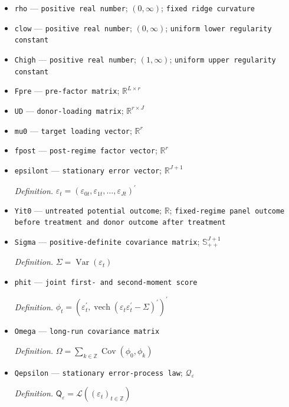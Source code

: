 \documentclass{article}
\begin{document}
\begin{itemize}
  \item \texttt{rho} --- \texttt{positive real number}; \((0,\infty)\); \texttt{fixed ridge curvature}
  \item \texttt{clow} --- \texttt{positive real number}; \((0,\infty)\); \texttt{uniform lower regularity constant}
  \item \texttt{Chigh} --- \texttt{positive real number}; \((1,\infty)\); \texttt{uniform upper regularity constant}
  \item \texttt{Fpre} --- \texttt{pre-\allowbreak{}factor matrix}; \(\mathbb R^{L\times r}\)
  \item \texttt{UD} --- \texttt{donor-\allowbreak{}loading matrix}; \(\mathbb R^{r\times J}\)
  \item \texttt{mu0} --- \texttt{target loading vector}; \(\mathbb R^r\)
  \item \texttt{fpost} --- \texttt{post-\allowbreak{}regime factor vector}; \(\mathbb R^r\)
  \item \texttt{epsilont} --- \texttt{stationary error vector}; \(\mathbb R^{J+1}\)
  \par\smallskip\noindent\emph{Definition.} \(\varepsilon_t=(\varepsilon_{0t},\varepsilon_{1t},\ldots,\varepsilon_{Jt})^{\prime}\)
  \item \texttt{Yit0} --- \texttt{untreated potential outcome}; \(\mathbb R\); \texttt{fixed-\allowbreak{}regime panel outcome before treatment and donor outcome after treatment}
  \item \texttt{Sigma} --- \texttt{positive-\allowbreak{}definite covariance matrix}; \(\mathbb S_{++}^{J+1}\)
  \par\smallskip\noindent\emph{Definition.} \(\Sigma=\operatorname{Var}(\varepsilon_t)\)
  \item \texttt{phit} --- \texttt{joint first-\allowbreak{} and second-\allowbreak{}moment score}
  \par\smallskip\noindent\emph{Definition.} \(\phi_t=(\varepsilon_t^{\prime},\operatorname{vech}(\varepsilon_t\varepsilon_t^{\prime}-\Sigma)^{\prime})^{\prime}\)
  \item \texttt{Omega} --- \texttt{long-\allowbreak{}run covariance matrix}
  \par\smallskip\noindent\emph{Definition.} \(\Omega=\sum_{k\in\mathbb Z}\operatorname{Cov}(\phi_0,\phi_k)\)
  \item \texttt{Qepsilon} --- \texttt{stationary error-\allowbreak{}process law}; \(\mathcal Q_{\varepsilon}\)
  \par\smallskip\noindent\emph{Definition.} \(\mathsf Q_{\varepsilon}=\mathcal L((\varepsilon_t)_{t\in\mathbb Z})\)

\end{itemize}
\end{document}
